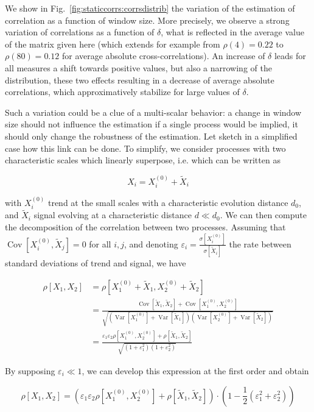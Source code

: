 \documentclass[11pt]{article}
\DeclareMathOperator{\Cov}{Cov}
\DeclareMathOperator{\Var}{Var}
\newcommand{\Covb}[2]{\ensuremath{\Cov\!\left[#1,#2\right]}}
\newcommand{\Varb}[1]{\ensuremath{\Var\!\left[#1\right]}}
\begin{document}
We show in Fig.~\ref{fig:staticcorrs:corrsdistrib} the variation of the estimation of correlation as a function of window size. More precisely, we observe a strong variation of correlations as a function of $\delta$, what is reflected in the average value of the matrix given here (which extends for example from $\rho(4)=0.22$ to $\rho(80)=0.12$ for average absolute cross-correlations). An increase of $\delta$ leads for all measures a shift towards positive values, but also a narrowing of the distribution, these two effects resulting in a decrease of average absolute correlations, which approximatively stabilize for large values of $\delta$.

Such a variation could be a clue of a multi-scalar behavior: a change in window size should not influence the estimation if a single process would be implied, it should only change the robustness of the estimation. Let sketch in a simplified case how this link can be done. To simplify, we consider processes with two characteristic scales which linearly superpose, i.e. which can be written as

\[
X_i = X_i^{(0)} + \tilde{X}_i
\]

with $X_i^{(0)}$ trend at the small scales with a characteristic evolution distance $d_0$, and $\tilde{X}_i$ signal evolving at a characteristic distance $d \ll d_0$. We can then compute the decomposition of the correlation between two processes. Assuming that $\Covb{X_i^{(0)}}{\tilde{X}_j} = 0$ for all $i,j$, and denoting $\varepsilon_i = \frac{\sigma\left[X_i^{(0)}\right]}{\sigma\left[\tilde{X}_i\right]}$ the rate between standard deviations of trend and signal, we have

\[
\begin{split}
	\rho\left[X_1,X_2\right] & = \rho\left[X_1^{(0)} + \tilde{X}_1,X_2^{(0)} + \tilde{X}_2\right]\\
	& = \frac{\Covb{\tilde{X}_1}{\tilde{X}_2} + \Covb{X_1^{(0)}}{X_2^{(0)}}}{\sqrt{\left(\Varb{X_1^{(0)}} + \Varb{\tilde{X}_1}\right)\left(\Varb{X_2^{(0)}} + \Varb{\tilde{X}_2}\right)}}\\
	& = \frac{\varepsilon_1 \varepsilon_2\rho\left[X_1^{(0)},X_2^{(0)}\right] + \rho\left[\tilde{X}_1,\tilde{X}_2\right]}{\sqrt{\left(1 + \varepsilon_1^2\right)\left(1 + \varepsilon_2^2\right)}}
\end{split}
\]

By supposing $\varepsilon_i \ll 1$, we can develop this expression at the first order and obtain

\begin{equation}
	\rho\left[X_1,X_2\right] = \left( \varepsilon_1 \varepsilon_2\rho\left[X_1^{(0)},X_2^{(0)}\right] + \rho\left[\tilde{X}_1,\tilde{X}_2\right]\right)\cdot\left(1 - \frac{1}{2}(\varepsilon_1^2 + \varepsilon_2^2)\right)
\end{equation}
\end{document}

